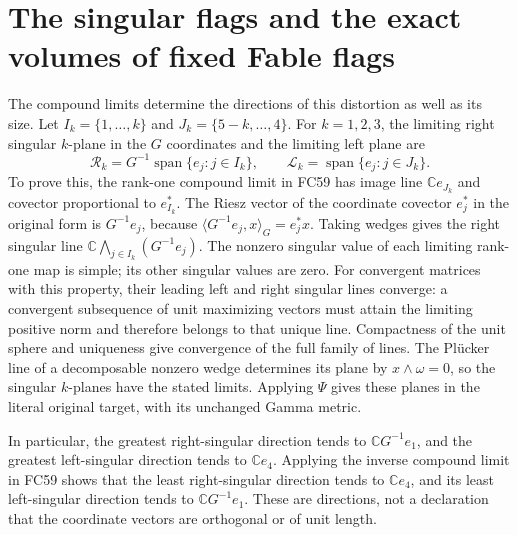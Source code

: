 \documentclass[11pt]{article}
\newcommand{\C}{\mathbb C}
\begin{document}
\section{The singular flags and the exact volumes of fixed Fable flags}
The compound limits determine the directions of this distortion as well
as its size. Let $I_k=\{1,\ldots,k\}$ and
$J_k=\{5-k,\ldots,4\}$. For $k=1,2,3$, the limiting right
singular $k$-plane in the $G$ coordinates and the limiting left plane are
\[
 \mathcal R_k=G^{-1}\operatorname{span}\{e_j:j\in I_k\},\qquad
 \mathcal L_k=\operatorname{span}\{e_j:j\in J_k\}.
 \tag{FC68}
\]
To prove this, the rank-one compound limit in FC59 has image line
$\C e_{J_k}$ and covector proportional to $e_{I_k}^*$.
The Riesz vector of the coordinate covector $e_j^*$ in the original
form is $G^{-1}e_j$, because
$\langle G^{-1}e_j,x\rangle_G=e_j^*x$.
Taking wedges gives the right singular line
$\C\bigwedge_{j\in I_k}(G^{-1}e_j)$. The nonzero singular value
of each limiting rank-one map is simple; its other singular values
are zero. For convergent matrices with this property, their leading
left and right singular lines converge: a convergent subsequence of
unit maximizing vectors must attain the limiting positive norm and
therefore belongs to that unique line. Compactness of the unit sphere
and uniqueness give convergence of the full family of lines. The
Pl\"ucker line of a decomposable nonzero wedge determines its plane
by $x\wedge\omega=0$, so the singular $k$-planes have the stated
limits. Applying $\Psi$ gives these planes in the literal original
target, with its unchanged Gamma metric.

In particular, the greatest right-singular direction tends to
$\C G^{-1}e_1$, and the greatest left-singular direction tends to
$\C e_4$. Applying the inverse compound limit in FC59 shows that
the least right-singular direction tends to $\C e_4$, and its
least left-singular direction tends to $\C G^{-1}e_1$.
These are directions, not a declaration that the coordinate vectors
are orthogonal or of unit length.
\end{document}
